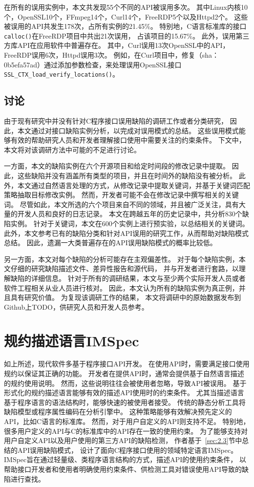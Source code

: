 在所有的误用实例中，本文共发现55个不同的API被误用多次。
其中Linux内核10个，OpenSSL10个，FFmpeg14个，Curl14个，FreeRDP5个以及Httpd2个。
这些被误用的API共发生178次，占所有实例的21.45\%。
特别地，C语言标准库的接口\texttt{calloc()}在FreeRDP项目中共出21次误用，
占该项目的15.67\%。
此外，误用第三方库API在应用软件中普遍存在。
其中，Curl误用13次OpenSSL中的API，FreeRDP误用6次，Httpd误用3次。
例如，在Curl项目中，修复（sha：0b5efa57ad）通过添加参数检查，来处理误用OpenSSL接口
\texttt{SSL\_CTX\_load\_verify\_locations()}。


\subsection{讨论}
由于现有研究中并没有针对C程序接口误用缺陷的调研工作或者分类研究，
因此，本文通过对接口缺陷实例分析，以完成对误用模式的总结。
这些误用模式能够有效的帮助研究人员和开发者理解接口使用中需要关注的约束条件。
下文中，本文将对该调研方法中可能的不足进行讨论。

一方面，本文的缺陷实例在六个开源项目和给定时间段的修改记录中提取。
因此，这些缺陷并没有涵盖所有类型的项目，并且在时间外的缺陷没有被分析。
此外，本文通过自然语言处理的方式，从修改记录中提取关键词，并基于关键词匹配策略抽取目标修改实例。
然而，开发者可能不会在修改记录中撰写相关的关键词。
尽管如此，本文所选的六个项目来自不同的领域，并且被广泛关注，具有大量的开发人员和良好的日志记录。
本文在跨越五年的历史记录中，共分析830个缺陷实例。
针对于关键词，本文在600个实例上进行预实验，以总结相关的关键词。
此外，本文参考已有的缺陷分类和针对API误用的研究工作，从而帮助对缺陷模式总结。
因此，遗漏一大类普遍存在的API误用缺陷模式的概率比较低。

另一方面，本文对每个缺陷的分析可能存在主观偏差性。
对于每个缺陷实例，本文仔细的研究缺陷描述文件、差异性报告和源代码，
并与开发者进行套路，以理解缺陷的详细信息。
针对于所有的调研结果，本文与至少两个实际开发人员或者软件工程相关从业人员进行核对。
因此，本文认为所有的缺陷实例为真正例，并且具有研究价值。
为复现该调研工作的结果，
本文将调研中的原始数据发布到Github上TODO，供研究人员和开发人员参考。

\section{规约描述语言IMSpec}
\label{sec:2.4}
如上所述，现代软件多基于程序接口API开发。
在使用API时，需要满足接口使用规约以保证其正确的功能。
开发者在提供API时，通常会提供基于自然语言描述的规约使用说明。
然而，这些说明往往会被使用者忽略，导致API被误用。
基于形式化的规约描述语言能够有效的描述API使用时的约束条件。
尤其当描述语言基于程序语言的语法结构时，能够快速的被使用者接受。
传统的静态分析工具将缺陷模型或程序属性编码在分析引擎中。
这种策略能够有效解决预先定义的API，比如C语言的标准库。
然而，对于用户自定义的API则支持不足。
特别地，很多用户定义的API与C的标准库中的API存在一致的使用约束。
为了能够支持对用户自定义API以及用户使用的第三方API的缺陷检测，
作者基于~\ref{sec:2.3}节中总结的API误用缺陷模式，
设计了面向C程序接口使用的领域特定语言IMSpec。
IMSpec旨在通过轻量级、类程序语言结构的方式，描述API的使用约束条件，
以帮助接口开发者和使用者明确使用约束条件、供检测工具对错误使用API导致的缺陷进行查找。

